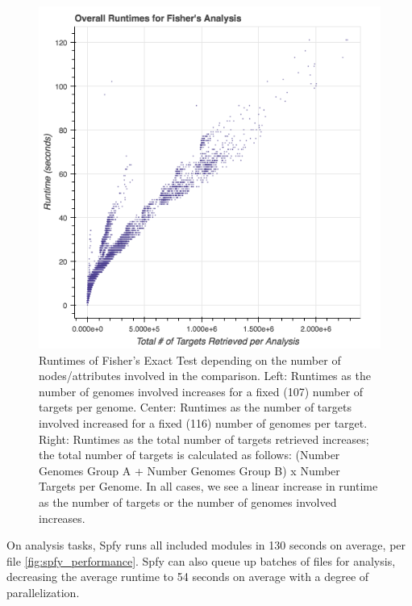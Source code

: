 \documentclass{article}
\begin{document}
\begin{figure}[!htb]
\endminipage\hfill
{}%
  \includegraphics[width=\linewidth]{images/fishers_overall.png}
\endminipage
\caption{Runtimes of Fisher's Exact Test depending on the number of nodes/attributes involved in the comparison. Left: Runtimes as the number of genomes involved increases for a fixed (107) number of targets per genome. Center: Runtimes as the number of targets involved increased for a fixed (116) number of genomes per target. Right: Runtimes as the total number of targets retrieved increases; the total number of targets is calculated as follows: (Number Genomes Group A + Number Genomes Group B) x Number Targets per Genome. In all cases, we see a linear increase in runtime as the number of targets or the number of genomes involved increases.}\label{fig:fishers_performance}
\end{figure}

On analysis tasks, Spfy runs all included modules in 130 seconds on average, per file \ref{fig:spfy_performance}.
Spfy can also queue up batches of files for analysis, decreasing the average runtime to 54 seconds on average with a degree of parallelization.
\end{document}
